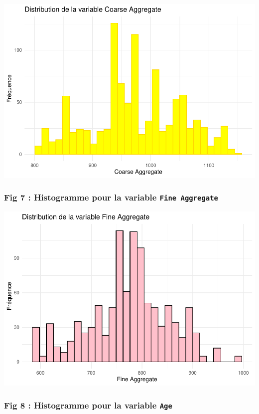 \documentclass[
  12pt,
]{article}
\begin{document}
\includegraphics{rmd_final_files/figure-latex/unnamed-chunk-28-1.pdf}

\subsubsection{\texorpdfstring{Fig 7 : Histogramme pour la variable
\texttt{Fine\ Aggregate}}{Fig 7 : Histogramme pour la variable Fine Aggregate}}\label{fig-7-histogramme-pour-la-variable-fine-aggregate}

\includegraphics{rmd_final_files/figure-latex/unnamed-chunk-29-1.pdf}

\subsubsection{\texorpdfstring{Fig 8 : Histogramme pour la variable
\texttt{Age}}{Fig 8 : Histogramme pour la variable Age}}\label{fig-8-histogramme-pour-la-variable-age}
\end{document}
